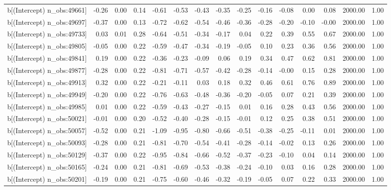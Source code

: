 \begin{table}[ht]
\begin{tabular}{rrrrrrrrrrrrrrr}
  b[(Intercept) n\_obs:49661] & -0.26 & 0.00 & 0.14 & -0.61 & -0.53 & -0.43 & -0.35 & -0.25 & -0.16 & -0.08 & 0.00 & 0.08 & 2000.00 & 1.00 \\ 
  b[(Intercept) n\_obs:49697] & -0.37 & 0.00 & 0.13 & -0.72 & -0.62 & -0.54 & -0.46 & -0.36 & -0.28 & -0.20 & -0.10 & -0.00 & 2000.00 & 1.00 \\ 
  b[(Intercept) n\_obs:49733] & 0.03 & 0.01 & 0.28 & -0.64 & -0.51 & -0.34 & -0.17 & 0.04 & 0.22 & 0.39 & 0.55 & 0.67 & 2000.00 & 1.00 \\ 
  b[(Intercept) n\_obs:49805] & -0.05 & 0.00 & 0.22 & -0.59 & -0.47 & -0.34 & -0.19 & -0.05 & 0.10 & 0.23 & 0.36 & 0.56 & 2000.00 & 1.00 \\ 
  b[(Intercept) n\_obs:49841] & 0.19 & 0.00 & 0.22 & -0.36 & -0.23 & -0.09 & 0.06 & 0.19 & 0.34 & 0.47 & 0.62 & 0.81 & 2000.00 & 1.00 \\ 
  b[(Intercept) n\_obs:49877] & -0.28 & 0.00 & 0.22 & -0.81 & -0.71 & -0.57 & -0.42 & -0.28 & -0.14 & -0.00 & 0.15 & 0.28 & 2000.00 & 1.00 \\ 
  b[(Intercept) n\_obs:49913] & 0.32 & 0.00 & 0.22 & -0.21 & -0.11 & 0.03 & 0.18 & 0.32 & 0.46 & 0.61 & 0.76 & 0.89 & 2000.00 & 1.00 \\ 
  b[(Intercept) n\_obs:49949] & -0.20 & 0.00 & 0.22 & -0.76 & -0.63 & -0.48 & -0.36 & -0.20 & -0.05 & 0.07 & 0.21 & 0.39 & 2000.00 & 1.00 \\ 
  b[(Intercept) n\_obs:49985] & 0.01 & 0.00 & 0.22 & -0.59 & -0.43 & -0.27 & -0.15 & 0.01 & 0.16 & 0.28 & 0.43 & 0.56 & 2000.00 & 1.00 \\ 
  b[(Intercept) n\_obs:50021] & -0.01 & 0.00 & 0.20 & -0.52 & -0.40 & -0.28 & -0.15 & -0.01 & 0.12 & 0.25 & 0.38 & 0.51 & 2000.00 & 1.00 \\ 
  b[(Intercept) n\_obs:50057] & -0.52 & 0.00 & 0.21 & -1.09 & -0.95 & -0.80 & -0.66 & -0.51 & -0.38 & -0.25 & -0.11 & 0.01 & 2000.00 & 1.00 \\ 
  b[(Intercept) n\_obs:50093] & -0.28 & 0.00 & 0.21 & -0.81 & -0.70 & -0.54 & -0.41 & -0.28 & -0.14 & -0.02 & 0.13 & 0.26 & 2000.00 & 1.00 \\ 
  b[(Intercept) n\_obs:50129] & -0.37 & 0.00 & 0.22 & -0.95 & -0.84 & -0.66 & -0.52 & -0.37 & -0.23 & -0.10 & 0.04 & 0.14 & 2000.00 & 1.00 \\ 
  b[(Intercept) n\_obs:50165] & -0.24 & 0.00 & 0.21 & -0.81 & -0.69 & -0.53 & -0.38 & -0.24 & -0.10 & 0.03 & 0.16 & 0.28 & 2000.00 & 1.00 \\ 
  b[(Intercept) n\_obs:50201] & -0.19 & 0.00 & 0.21 & -0.75 & -0.60 & -0.46 & -0.32 & -0.19 & -0.05 & 0.07 & 0.22 & 0.33 & 2000.00 & 1.00 \\ 

\end{tabular}
\end{table}
